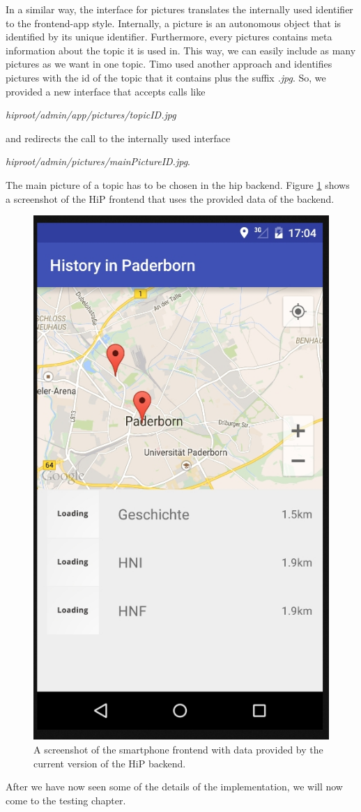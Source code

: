 In a similar way, the interface for pictures translates the internally used identifier to the frontend-app style. Internally, a picture is an autonomous object that is identified by its unique identifier. Furthermore, every pictures contains meta information about the topic it is used in. This way, we can easily include as many pictures as we want in one topic. Timo used another approach and identifies pictures with the id of the topic that it contains plus the suffix \emph{.jpg}. So, we provided a new interface that accepts calls like 

\emph{hiproot/admin/app/pictures/topicID.jpg} 

and redirects the call to the internally used interface

\emph{hiproot/admin/pictures/mainPictureID.jpg}. 

The main picture of a topic has to be chosen in the hip backend. Figure \ref{frontendScreenshot} shows a screenshot of the \ac{HiP} frontend that uses the provided data of the backend. 

\begin{figure}[th]
\centerline{\includegraphics[width=.5\textwidth]{gfx/frontend.jpg}}
\caption{A screenshot of the smartphone frontend with data provided by the current version of the \ac{HiP} backend.}
\label{frontendScreenshot}
\end{figure}     

After we have now seen some of the details of the implementation, we will now come to the testing chapter. 